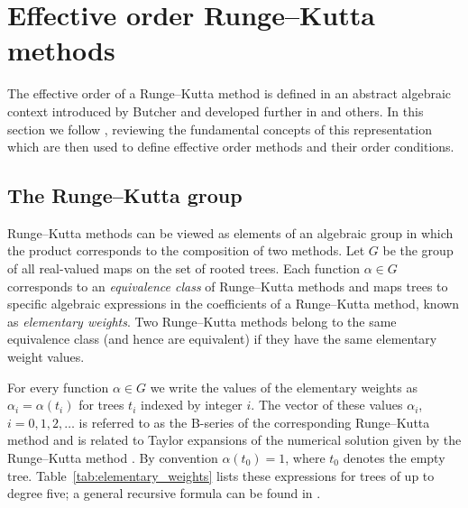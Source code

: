 \section{Effective order Runge--Kutta methods}\label{sec:Algebraic_RK}

The effective order of a Runge--Kutta method is defined in an abstract algebraic
context introduced by Butcher \cite{Butcher1969} and developed further in
\cite{Butcher1972, Hairer1974, Butcher1996, Butcher1998} and others.
In this section we follow \cite{Butcher2008_book}, reviewing the fundamental
concepts of this representation which are then used to define
effective order methods and their order conditions.


\subsection{The Runge--Kutta group}\label{sec:RK_group}


Runge--Kutta methods can be viewed as elements of an algebraic group
in which the product corresponds to the composition of two methods.
Let $G$ be the group of all real-valued maps on the set
of rooted trees.
Each function $\alpha \in G$ corresponds
to an \emph{equivalence class} of Runge--Kutta methods and maps trees to specific
algebraic expressions in the coefficients
of a Runge--Kutta method, known as \emph{elementary weights}.
Two Runge--Kutta methods belong to the same equivalence class (and hence 
are equivalent) if they have the same elementary weight values.

For every function $\alpha \in G$ we write the values of the
elementary weights as $\alpha_{i} = \alpha(t_{i})$ for trees $t_{i}$
indexed by integer $i$.
The vector of these values $\alpha_i$, $i = 0, 1, 2,\ldots$ is referred to as the B-series
of the corresponding Runge--Kutta method and is related to Taylor expansions of the numerical solution given by the Runge--Kutta method \cite{Hairer1974, Butcher2008_book}. 
By convention $\alpha(t_{0}) = 1$, where $t_{0}$ denotes the empty tree. 
Table~\ref{tab:elementary_weights} lists these expressions for trees of up to degree five; a general recursive formula can be found in \cite[Definition 312]{Butcher2008_book}. 

